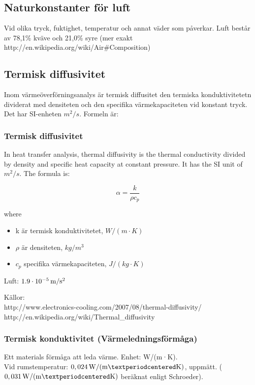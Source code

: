 \subsection{Naturkonstanter för luft}

Vid olika tryck, fuktighet, temperatur och annat väder som påverkar. Luft består av 78,1\% kväve och 21,0\% syre (mer exakt http://en.wikipedia.org/wiki/Air\#Composition)


\subsection{Termisk diffusivitet} %
Inom värmeöverförningsanalys är termisk diffusitet den termiska konduktivitetetn dividerat med densiteten och den specifika värmekapaciteten vid konstant tryck. Det har SI-enheten $m^2/s$. Formeln är:

\subsubsection{Termisk diffusivitet}
In heat transfer analysis, thermal diffusivity is the thermal conductivity divided by density and specific heat capacity at constant pressure. It has the SI unit of $m^2/s$. The formula is:

\begin{equation}
\alpha=\frac{k}{\rho c_p}
\end{equation}

where
\begin{itemize}
   \item[] k är termisk konduktivitetet, $\unit{W/(m·K)}$
   \item[] $\rho$ är densiteten, $\unit{kg/m^3}$
   \item[] $c_p$ specifika värmekapaciteten, $\unit{J/(kg·K)}$
\end{itemize}

Luft: $\unit[1.9\cdot10^{-5}]{m/s^2}$

Källor:\\
http://www.electronics-cooling.com/2007/08/thermal-diffusivity/\\
http://en.wikipedia.org/wiki/Thermal\_diffusivity\\


\subsubsection{Termisk konduktivitet (Värmeledningsförmåga)} %
Ett materials förmåga att leda värme. Enhet: W/(m·K).\\
Vid rumstemperatur: $\unit[0,024]{W/(m·K)}$, uppmätt. ($\unit[0,031]{W/(m·K)}$ beräknat enligt Schroeder).

